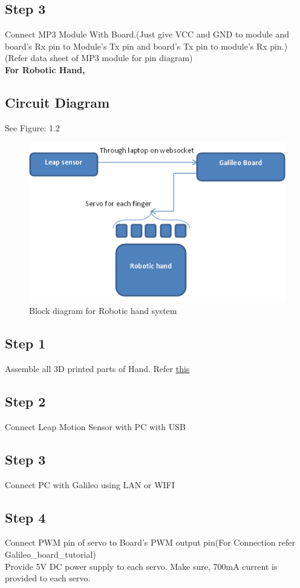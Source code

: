 \documentclass[a4paper,12pt,oneside]{book}
\begin{document}
\subsection*{Step 3}
Connect MP3 Module With Board.(Just give VCC and GND to module and board's Rx pin to Module's Tx pin and board's Tx pin to module's Rx pin.)(Refer data sheet of MP3 module for pin diagram)\\
\newpage
\textbf{For Robotic Hand,}
\subsection*{Circuit Diagram}
See Figure: 1.2
\begin{figure}
  \includegraphics[width=\linewidth]{2.png}
  \caption{Block diagram for Robotic hand system}
\end{figure}
\subsection*{Step 1}
Assemble all 3D printed parts of Hand. Refer \href{http://inmoov.fr/hand-and-forarm/}{this}
\subsection*{Step 2}
Connect Leap Motion Sensor with PC with USB
\subsection*{Step 3}
Connect PC with Galileo using LAN or WIFI
\subsection*{Step 4}
Connect PWM pin of servo to Board's PWM output pin(For Connection refer Galileo\_board\_tutorial)\\
Provide 5V DC power supply to each servo. Make sure, 700mA current is provided to each servo.
\end{document}
